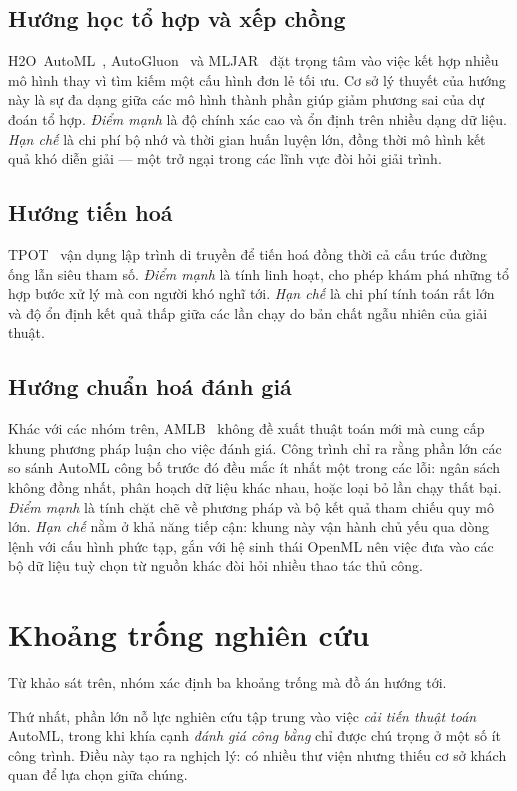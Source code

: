 \subsection{Hướng học tổ hợp và xếp chồng}
H2O~AutoML~\cite{ledell2020h2o}, AutoGluon~\cite{erickson2020autogluon} và
MLJAR~\cite{plonska2021mljar} đặt trọng tâm vào việc kết hợp nhiều mô hình thay vì
tìm kiếm một cấu hình đơn lẻ tối ưu. Cơ sở lý thuyết của hướng này là sự đa dạng
giữa các mô hình thành phần giúp giảm phương sai của dự đoán tổ hợp.
\textit{Điểm mạnh} là độ chính xác cao và ổn định trên nhiều dạng dữ liệu.
\textit{Hạn chế} là chi phí bộ nhớ và thời gian huấn luyện lớn, đồng thời mô hình
kết quả khó diễn giải --- một trở ngại trong các lĩnh vực đòi hỏi giải trình.

\subsection{Hướng tiến hoá}
TPOT~\cite{olson2016tpot} vận dụng lập trình di truyền để tiến hoá đồng thời cả
cấu trúc đường ống lẫn siêu tham số. \textit{Điểm mạnh} là tính linh hoạt, cho
phép khám phá những tổ hợp bước xử lý mà con người khó nghĩ tới. \textit{Hạn chế}
là chi phí tính toán rất lớn và độ ổn định kết quả thấp giữa các lần chạy do bản
chất ngẫu nhiên của giải thuật.

\subsection{Hướng chuẩn hoá đánh giá}
Khác với các nhóm trên, AMLB~\cite{gijsbers2024amlb} không đề xuất thuật toán mới
mà cung cấp khung phương pháp luận cho việc đánh giá. Công trình chỉ ra rằng phần
lớn các so sánh AutoML công bố trước đó đều mắc ít nhất một trong các lỗi: ngân
sách không đồng nhất, phân hoạch dữ liệu khác nhau, hoặc loại bỏ lần chạy thất
bại. \textit{Điểm mạnh} là tính chặt chẽ về phương pháp và bộ kết quả tham chiếu
quy mô lớn. \textit{Hạn chế} nằm ở khả năng tiếp cận: khung này vận hành chủ yếu
qua dòng lệnh với cấu hình phức tạp, gắn với hệ sinh thái OpenML nên việc đưa vào
các bộ dữ liệu tuỳ chọn từ nguồn khác đòi hỏi nhiều thao tác thủ công.

\section{Khoảng trống nghiên cứu}
\label{sec:khoangtrong}
Từ khảo sát trên, nhóm xác định ba khoảng trống mà đồ án hướng tới.

Thứ nhất, phần lớn nỗ lực nghiên cứu tập trung vào việc \emph{cải tiến thuật
toán} AutoML, trong khi khía cạnh \emph{đánh giá công bằng} chỉ được chú trọng ở
một số ít công trình. Điều này tạo ra nghịch lý: có nhiều thư viện nhưng thiếu cơ
sở khách quan để lựa chọn giữa chúng.

